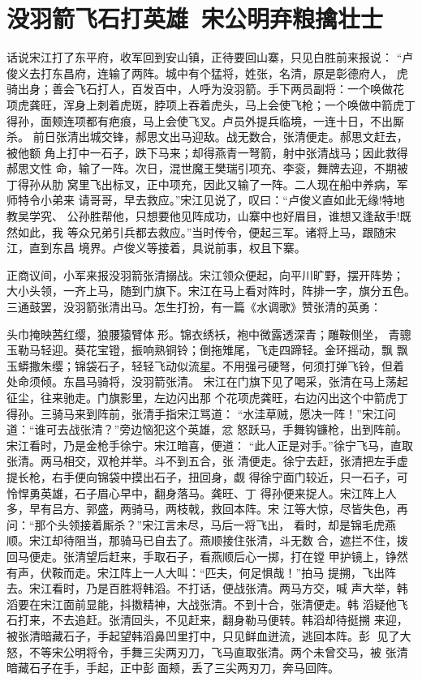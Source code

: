\chapter{没羽箭飞石打英雄~宋公明弃粮擒壮士}

话说宋江打了东平府，收军回到安山镇，正待要回山寨，只见白胜前来报说：
“卢俊义去打东昌府，连输了两阵。城中有个猛将，姓张，名清，原是彰德府人，
虎骑出身；善会飞石打人，百发百中，人呼为没羽箭。手下两员副将：一个唤做花
项虎龚旺，浑身上刺着虎斑，脖项上吞着虎头，马上会使飞枪；一个唤做中箭虎丁
得孙，面颊连项都有疤痕，马上会使飞叉。卢员外提兵临境，一连十日，不出厮杀。
前日张清出城交锋，郝思文出马迎敌。战无数合，张清便走。郝思文赶去，被他额
角上打中一石子，跌下马来；却得燕青一弩箭，射中张清战马；因此救得郝思文性
命，输了一阵。次日，混世魔王樊瑞引项充、李衮，舞牌去迎，不期被丁得孙从肋
窝里飞出标叉，正中项充，因此又输了一阵。二人现在船中养病，军师特令小弟来
请哥哥，早去救应。”宋江见说了，叹曰：“卢俊义直如此无缘!特地教吴学究、
公孙胜帮他，只想要他见阵成功，山寨中也好眉目，谁想又逢敌手!既然如此，我
等众兄弟引兵都去救应。”当时传令，便起三军。诸将上马，跟随宋江，直到东昌
境界。卢俊义等接着，具说前事，权且下寨。

正商议间，小军来报没羽箭张清搦战。宋江领众便起，向平川旷野，摆开阵势；
大小头领，一齐上马，随到门旗下。宋江在马上看对阵时，阵排一字，旗分五色。
三通鼓罢，没羽箭张清出马。怎生打扮，有一篇《水调歌》赞张清的英勇：

头巾掩映茜红缨，狼腰猿臂体形。锦衣绣袄，袍中微露透深青；雕鞍侧坐，
青骢玉勒马轻迎。葵花宝镫，振响熟铜铃；倒拖雉尾，飞走四蹄轻。金环摇动，飘
飘玉蟒撒朱缨；锦袋石子，轻轻飞动似流星。不用强弓硬弩，何须打弹飞铃，但着
处命须倾。东昌马骑将，没羽箭张清。
宋江在门旗下见了喝采，张清在马上荡起征尘，往来驰走。门旗影里，左边闪出那
个花项虎龚旺，右边闪出这个中箭虎丁得孙。三骑马来到阵前，张清手指宋江骂道：
“水洼草贼，愿决一阵！”宋江问道：“谁可去战张清？”旁边恼犯这个英雄，忿
怒跃马，手舞钩镰枪，出到阵前。宋江看时，乃是金枪手徐宁。宋江暗喜，便道：
“此人正是对手。”徐宁飞马，直取张清。两马相交，双枪并举。斗不到五合，张
清便走。徐宁去赶，张清把左手虚提长枪，右手便向锦袋中摸出石子，扭回身，觑
得徐宁面门较近，只一石子，可怜悍勇英雄，石子眉心早中，翻身落马。龚旺、丁
得孙便来捉人。宋江阵上人多，早有吕方、郭盛，两骑马，两枝戟，救回本阵。宋
江等大惊，尽皆失色，再问：“那个头领接着厮杀？”宋江言未尽，马后一将飞出，
看时，却是锦毛虎燕顺。宋江却待阻当，那骑马已自去了。燕顺接住张清，斗无数
合，遮拦不住，拨回马便走。张清望后赶来，手取石子，看燕顺后心一掷，打在镗
甲护镜上，铮然有声，伏鞍而走。宋江阵上一人大叫：“匹夫，何足惧哉！”拍马
提搠，飞出阵去。宋江看时，乃是百胜将韩滔。不打话，便战张清。两马方交，喊
声大举，韩滔要在宋江面前显能，抖擞精神，大战张清。不到十合，张清便走。韩
滔疑他飞石打来，不去追赶。张清回头，不见赶来，翻身勒马便转。韩滔却待挺搠
来迎，被张清暗藏石子，手起望韩滔鼻凹里打中，只见鲜血迸流，逃回本阵。彭
见了大怒，不等宋公明将令，手舞三尖两刃刀，飞马直取张清。两个未曾交马，被
张清暗藏石子在手，手起，正中彭面颊，丢了三尖两刃刀，奔马回阵。

